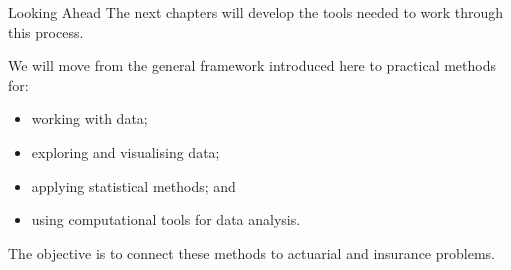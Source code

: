 \documentclass[
  ignorenonframetext,
  aspectratio=169,
]{beamer}
\providecommand{\tightlist}{%
  \setlength{\itemsep}{0pt}\setlength{\parskip}{0pt}}
\begin{document}
\begin{frame}{Looking Ahead}
\protect{}\label{looking-ahead}
The next chapters will develop the tools needed to work through this
process.

We will move from the general framework introduced here to practical
methods for:

\begin{itemize}
\tightlist
\item
  working with data;
\item
  exploring and visualising data;
\item
  applying statistical methods; and
\item
  using computational tools for data analysis.
\end{itemize}

The objective is to connect these methods to actuarial and insurance
problems.
\end{frame}
\end{document}
